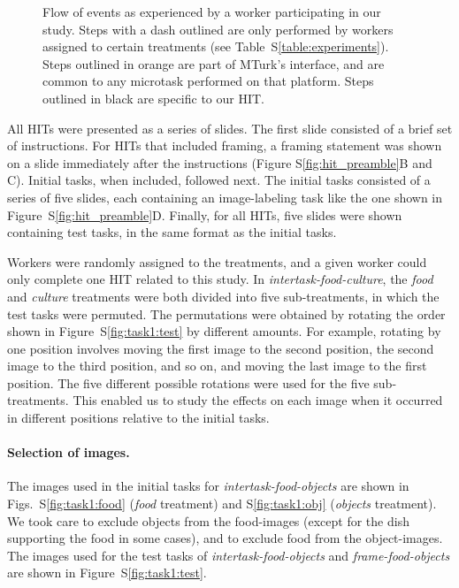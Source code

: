 \documentclass{sigchi}
\begin{document}
\begin{figure}
\begin{center}
	\caption{Flow of events as experienced by a worker participating in
		our study.  Steps with a dash outlined are only performed by 
		workers assigned to certain treatments 
		(see Table~S\ref{table:experiments}).  Steps outlined in orange are
		part of MTurk's interface, and are common to any 
		microtask performed on that platform.  Steps outlined in black are
		specific to our HIT.
	}
	\label{fig:task_schematic}
	\end{center}
\end{figure}

All HITs were presented as a series of slides.  The first 
slide consisted of a brief set of instructions.  For HITs that included 
framing, a framing statement was shown on a slide immediately after the 
instructions (Figure S\ref{fig:hit_preamble}B and C).  
Initial tasks, when included, followed next.  The initial tasks consisted of 
a series of five slides, each containing an image-labeling task like the one 
shown in 
Figure~S\ref{fig:hit_preamble}D.  Finally, for all HITs, five slides were shown
containing test tasks, in the same format as the initial tasks.

Workers were randomly assigned to the treatments, and 
a given worker could only complete one HIT related to this study.  
In \textit{intertask-food-culture}, the \textit{food} and \textit{culture}
treatments were both divided into five sub-treatments, 
in which the test tasks were permuted.  
The permutations were obtained by rotating 
the order shown in Figure~S\ref{fig:task1:test} by different amounts. 
For example, rotating by one position involves moving the first image to the 
second position, the second image to the third position, and so on, and 
moving the last image to the first position.  
The five different possible rotations were used for the five 
sub-treatments.  This enabled us to study the effects on each image when
it occurred in different positions relative to the initial tasks.

\paragraph{Selection of images.} 

The images used in the initial tasks for \textit{intertask-food-objects}  
are shown in Figs.~S\ref{fig:task1:food} (\textit{food} treatment) and 
S\ref{fig:task1:obj} (\textit{objects} treatment).
We took care to exclude objects from
the food-images (except for the dish supporting the food in some cases), and 
to exclude food from the object-images.  The images used for the test tasks
of \textit{intertask-food-objects} and \textit{frame-food-objects} are shown 
in Figure~S\ref{fig:task1:test}.
\end{document}
